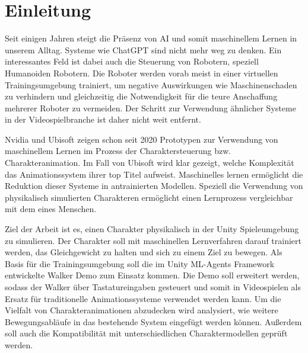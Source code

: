 \chapter{Einleitung}
\label{sec:einleitung}
Seit einigen Jahren steigt die Präsenz von AI und somit maschinellem Lernen in unserem Alltag. Systeme wie ChatGPT sind nicht mehr weg zu denken. Ein interessantes Feld ist dabei auch die Steuerung von Robotern, speziell Humanoiden Robotern. Die Roboter werden vorab meist in einer virtuellen Trainingsumgebung trainiert, um negative Auswirkungen wie Maschinenschaden zu verhindern und gleichzeitig die Notwendigkeit für die teure Anschaffung mehrerer Roboter zu vermeiden. Der Schritt zur Verwendung ähnlicher Systeme in der Videospielbranche ist daher nicht weit entfernt.

Nvidia und Ubisoft zeigen schon seit 2020 Prototypen zur Verwendung von maschinellem Lernen im Prozess der Charaktersteuerung bzw. Charakteranimation.\cite{2022-TOG-ASE}\cite{10.1145/3355089.3356536} Im Fall von Ubisoft wird klar gezeigt, welche Komplexität das Animationssystem ihrer top Titel aufweist. Maschinelles lernen ermöglicht die Reduktion dieser Systeme in antrainierten Modellen. Speziell die Verwendung von physikalisch simulierten Charakteren ermöglicht einen Lernprozess vergleichbar mit dem eines Menschen.

Ziel der Arbeit ist es, einen Charakter physikalisch in der Unity Spieleumgebung zu simulieren. Der Charakter soll mit maschinellen Lernverfahren darauf trainiert werden, das Gleichgewicht zu halten und sich zu einem Ziel zu bewegen. Als Basis für die Trainingsumgebung soll die im Unity ML-Agents Framework entwickelte Walker Demo zum Einsatz kommen. Die Demo soll erweitert werden, sodass der Walker über Tastatureingaben gesteuert und somit in Videospielen als Ersatz für traditionelle Animationssysteme verwendet werden kann. Um die Vielfalt von Charakteranimationen abzudecken wird analysiert, wie weitere Bewegungsabläufe in das bestehende System eingefügt werden können. Außerdem soll auch die Kompatibilität mit unterschiedlichen Charaktermodellen geprüft werden.

